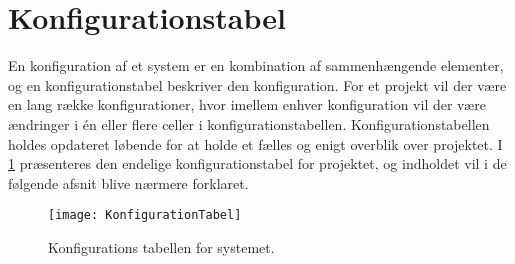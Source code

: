 \section{Konfigurationstabel}\label{konfigurationstabel}
En konfiguration af et system er en kombination af sammenhængende elementer, og en konfigurationstabel beskriver den konfiguration.
For et projekt vil der være en lang række konfigurationer, hvor imellem enhver konfiguration vil der være ændringer i én eller flere celler i konfigurationstabellen.
Konfigurationstabellen holdes opdateret løbende for at holde et fælles og enigt overblik over projektet.
I \cref{tab:konfigurationsTabel} præsenteres den endelige konfigurationstabel for projektet, og indholdet vil i de følgende afsnit blive nærmere forklaret.

\begin{figure}
\texttt{[image: KonfigurationTabel]}
\caption{Konfigurations tabellen for systemet.}
\label{tab:konfigurationsTabel}
\end{figure}
